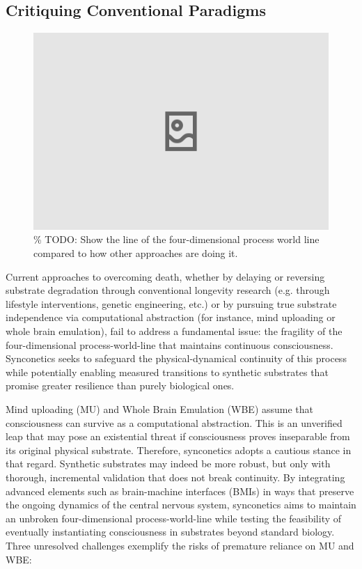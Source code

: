 \documentclass[10pt]{article}
\begin{document}
\begin{sloppypar}
  \subsection{Critiquing Conventional Paradigms}
  \label{sec:new-paradigm}

  \begin{figure}[ht!]
    \centering
    \includegraphics[width=\textwidth]{figures/other-approaches.png}
    \caption{\% TODO: Show the line of the four-dimensional process world line compared to how other approaches are doing it.}
    \label{fig:other-approaches}
  \end{figure}

  Current approaches to overcoming death, whether by delaying or reversing substrate degradation through conventional longevity research (e.g. through lifestyle interventions, genetic engineering, etc.) or by pursuing true substrate independence via computational abstraction (for instance, mind uploading or whole brain emulation), fail to address a fundamental issue: the fragility of the four-dimensional process-world-line that maintains continuous consciousness. Synconetics seeks to safeguard the physical-dynamical continuity of this process while potentially enabling measured transitions to synthetic substrates that promise greater resilience than purely biological ones.

  Mind uploading (MU) and Whole Brain Emulation (WBE) assume that consciousness can survive as a computational abstraction. This is an unverified leap that may pose an existential threat if consciousness proves inseparable from its original physical substrate. Therefore, synconetics adopts a cautious stance in that regard. Synthetic substrates may indeed be more robust, but only with thorough, incremental validation that does not break continuity. By integrating advanced elements such as brain-machine interfaces (BMIs) in ways that preserve the ongoing dynamics of the central nervous system, synconetics aims to maintain an unbroken four-dimensional process-world-line while testing the feasibility of eventually instantiating consciousness in substrates beyond standard biology. Three unresolved challenges exemplify the risks of premature reliance on MU and WBE:


\end{sloppypar}
\end{document}
